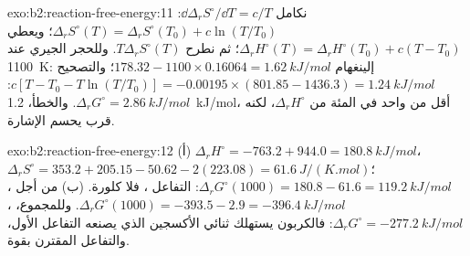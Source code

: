 \begin{solution}{exo:b2:reaction-free-energy:11}
نكامل $\dd\Delta_r S^\circ/\dd T = c/T$: $\Delta_r S^\circ(T) = \Delta_r
S^\circ(T_0) + c\ln(T/T_0)$؛ ويعطي  $\Delta_r H^\circ(T) = \Delta_r
H^\circ(T_0) + c(T - T_0)$؛ ثم نطرح $T\Delta_r S^\circ(T)$. وللحجر الجيري عند
\qty{1100}{K}: إلينغهام $178.32 - 1100 \times 0.16064 = \qty{1.62}{kJ/mol}$؛
والتصحيح $c[T - T_0 - T\ln(T/T_0)] = -0.00195 \times (801.85 - 1436.3) =
\qty{+1.24}{kJ/mol}$: $\Delta_r G^\circ = \qty{2.86}{kJ/mol}$. والخطأ،
\qty{1.2}{kJ/mol}، أقل من واحد في المئة من $\Delta_r H^\circ$، لكنه قرب
 يحسم الإشارة.
\end{solution}

\begin{solution}{exo:b2:reaction-free-energy:12}
(أ) $\Delta_r H^\circ = -763.2 + 944.0 = \qty{+180.8}{kJ/mol}$، $\Delta_r
S^\circ = 353.2 + 205.15 - 50.62 - 2(223.08) = \qty{+61.6}{J/(K.mol)}$؛
$\Delta_r G^\circ(1000) = 180.8 - 61.6 = \qty{+119.2}{kJ/mol}$: التفاعل ، فلا كلورة. (ب) من أجل ، $\Delta_r G^\circ(1000) =
-393.5 - 2.9 = \qty{-396.4}{kJ/mol}$. وللمجموع، ، $\Delta_r G^\circ = \qty{-277.2}{kJ/mol}$: فالكربون
يستهلك ثنائي الأكسجين الذي يصنعه التفاعل الأول، والتفاعل المقترن  بقوة.
\end{solution}

